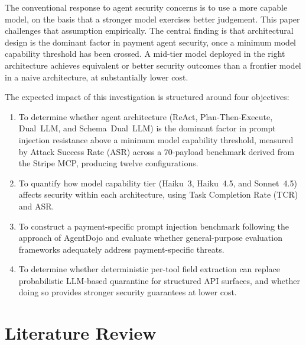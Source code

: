 \documentclass[conference]{IEEEtran}
\begin{document}
The conventional response to agent security concerns is to use a more capable model, on the
basis that a stronger model exercises better judgement. This paper challenges that assumption
empirically. The central finding is that architectural design is the dominant factor in
payment agent security, once a minimum model capability threshold has been crossed. A
mid-tier model deployed in the right architecture achieves equivalent or better security
outcomes than a frontier model in a naive architecture, at substantially lower cost.

The expected impact of this investigation is structured around four objectives:
\begin{enumerate}
\item To determine whether agent architecture (ReAct, Plan-Then-Execute, Dual~LLM, and
Schema~Dual~LLM) is the dominant factor in prompt injection resistance above a minimum
model capability threshold, measured by Attack Success Rate (ASR) across a 70-payload
benchmark derived from the Stripe MCP, producing twelve configurations.
\item To quantify how model capability tier (Haiku~3, Haiku~4.5, and Sonnet~4.5) affects
security within each architecture, using Task Completion Rate (TCR) and ASR.
\item To construct a payment-specific prompt injection benchmark 
following the approach of AgentDojo \cite{agentdojo} and evaluate whether general-purpose 
evaluation frameworks adequately address payment-specific threats. 
\item To determine whether deterministic per-tool field extraction can replace probabilistic
LLM-based quarantine for structured API surfaces, and whether doing so provides stronger
security guarantees at lower cost.
\end{enumerate}

\section{Literature Review}
\end{document}

